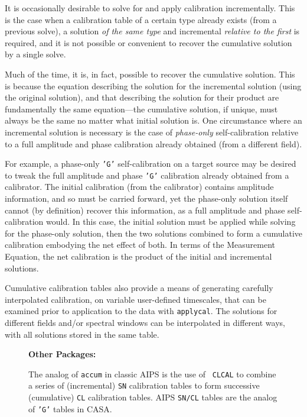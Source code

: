 It is occasionally desirable to solve for and apply calibration
incrementally.  This is the case when a calibration table of a certain
type already exists (from a previous solve), a solution {\it of the
same type} and incremental {\it relative to the first} is required,
and it is not possible or convenient to recover the cumulative
solution by a single solve.

Much of the time, it is, in fact, possible to recover the cumulative
solution. This is because the equation describing the solution for the
incremental solution (using the original solution), and that describing
the solution for their product are fundamentally the same equation---the
cumulative solution, if unique, must always be the same no matter what
initial solution is.  One circumstance where an incremental solution is
necessary is the case of {\it phase-only} self-calibration relative to a
full amplitude and phase calibration already obtained (from a different
field).

For example, a phase-only {\tt 'G'} self-calibration on a target source may be
desired to tweak the full amplitude and phase {\tt 'G'} calibration already
obtained from a calibrator. The initial calibration (from the calibrator)
contains amplitude information, and so must be carried forward, yet the
phase-only solution itself cannot (by definition) recover this
information, as a full amplitude and phase self-calibration would. In this
case, the initial solution must be applied while solving for the
phase-only solution, then the two solutions combined to form a cumulative
calibration embodying the net effect of both. In terms of the Measurement
Equation, the net calibration is the product of the initial and
incremental solutions.

Cumulative calibration tables also provide a means of generating
carefully interpolated calibration, on variable user-defined
timescales, that can be examined prior to application to the data with
{\tt applycal}. The solutions for different fields and/or spectral
windows can be interpolated in different ways, with all solutions
stored in the same table.

\begin{wrapfigure}{r}{2.5in}
  \begin{boxedminipage}{2.5in}
     \centerline{\bf Other Packages:}
     The analog of {\tt accum} in classic AIPS is the use of {\tt
     CLCAL} to combine a series of (incremental) {\tt SN} calibration
     tables to form successive (cumulative) {\tt CL} calibration
     tables. AIPS {\tt SN/CL} tables are the analog of {\tt 'G'} 
     tables in CASA.
  \end{boxedminipage}
\end{wrapfigure}

